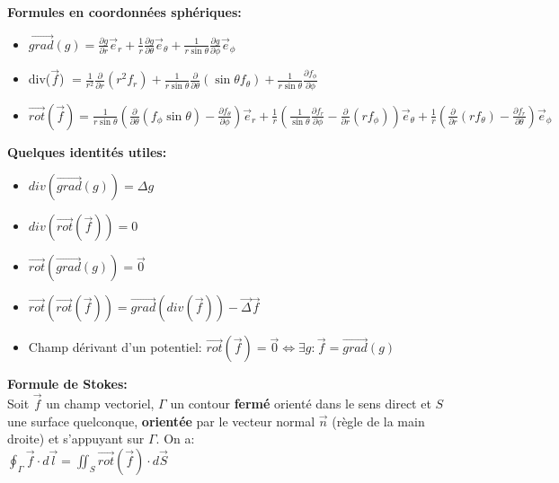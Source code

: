\documentclass{article}
\begin{document}
\textbf{Formules en coordonnées sphériques:} \\[0.2cm]
\begin{itemize}
  \item $\vec{grad} (g) = \frac{\partial g}{\partial r} \vec{e}_r + \frac{1}{r} \frac{\partial g}{\partial \theta} \vec{e}_\theta + \frac{1}{r \sin \theta} \frac{\partial g}{\partial \phi} \vec{e}_\phi$
  \item div($\vec{f}$) $=\frac{1}{r^2} \frac{\partial}{\partial r}(r^2 f_r) + \frac{1}{r \sin \theta} \frac{\partial}{\partial \theta}(\sin \theta f_\theta) + \frac{1}{r \sin \theta} \frac{\partial f_\phi}{\partial \phi}$
  \item $\vec{rot}(\vec{f})  = \frac{1}{r \sin \theta} \left( \frac{\partial}{\partial \theta}(f_\phi \sin \theta) - \frac{\partial f_\theta}{\partial \phi} \right) \vec{e}_r
  + \frac{1}{r} \left( \frac{1}{\sin \theta} \frac{\partial f_r}{\partial \phi} - \frac{\partial}{\partial r}(r f_\phi) \right) \vec{e}_\theta
  + \frac{1}{r} \left( \frac{\partial}{\partial r}(r f_\theta) - \frac{\partial f_r}{\partial \theta} \right) \vec{e}_\phi $ \\[1cm]
  

\end{itemize}

\textbf{Quelques identités utiles:} \\[0.2cm]
\begin{itemize}
  \item $div(\vec{grad}(g)) = \Delta g  $
  \item $div(\vec{rot}(\vec{f})) = 0$
  \item $\vec{rot}(\vec{grad}(g)) = \vec{0}$
  \item $ \vec{rot}(\vec{rot}(\vec{f})) = \vec{grad}(div(\vec{f})) - \vec{\Delta} \vec{f}$
  \item Champ dérivant d'un potentiel: $  \vec{rot}(\vec{f}) = \vec{0} \Leftrightarrow   \exists g :   \vec{f} = \vec{grad}(g)  $ \\[0.3cm]

\end{itemize}


\textbf{Formule de Stokes:} \\[0.2cm]

Soit $\vec{f}$ un champ vectoriel, $\Gamma$ un contour \textbf{fermé}  orienté dans le sens direct et $S$ une surface quelconque, \textbf{orientée} par le vecteur normal $\vec{n}$ (règle de la main droite) et s'appuyant sur $\Gamma$. On a:\\[0.15cm]
$\boxed{ \oint_\Gamma \vec{f} \cdot d\vec{l} = \iint_S \vec{rot}(\vec{f}) \cdot d\vec{S}}$\\[0.3cm]
\end{document}
